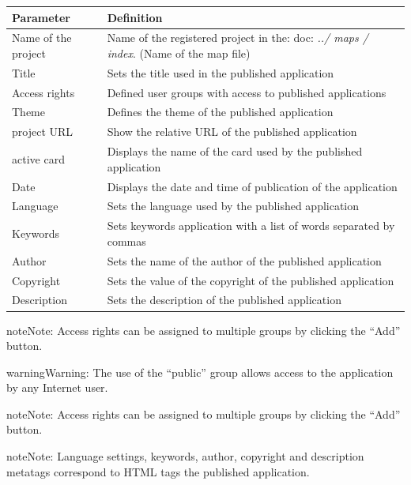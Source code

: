 \documentclass[letterpaper,10pt,english]{sphinxmanual}
\begin{document}
\begin{tabulary}{\linewidth}{|L|L|}
\hline

\textbf{Parameter}
 & 
\textbf{Definition}
\\
\hline
Name of the project
 & 
Name of the registered project in the: doc: \emph{../ maps / index}. (Name of the map file)
\\
\hline
Title
 & 
Sets the title used in the published application
\\
\hline
Access rights
 & 
Defined user groups with access to published applications
\\
\hline
Theme
 & 
Defines the theme of the published application
\\
\hline
project  URL
 & 
Show the relative URL of the published application
\\
\hline
active card
 & 
Displays the name of the card used by the published application
\\
\hline
Date
 & 
Displays the date and time of publication of the application
\\
\hline
Language
 & 
Sets the language used by the published application
\\
\hline
Keywords
 & 
Sets keywords application with a list of words separated by commas
\\
\hline
Author
 & 
Sets the name of the author of the published application
\\
\hline
Copyright
 & 
Sets the value of the copyright of the published application
\\
\hline
Description
 & 
Sets the description of the published application
\\
\hline\end{tabulary}


\begin{notice}{note}{Note:}
Access rights can be assigned to multiple groups by clicking the ``Add'' button.
\end{notice}

\begin{notice}{warning}{Warning:}
The use of the ``public'' group allows access to the application by any Internet user.
\end{notice}

\begin{notice}{note}{Note:}
Access rights can be assigned to multiple groups by clicking the ``Add'' button.
\end{notice}

\begin{notice}{note}{Note:}
Language settings, keywords, author, copyright and description metatags correspond to HTML tags the published application.
\end{notice}
\end{document}
